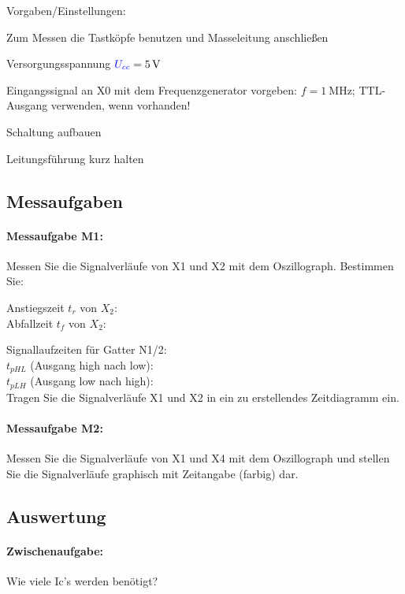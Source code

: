 \documentclass[11pt,a4paper,titlepage,parskip=half]{scrreprt}
\begin{document}
      Vorgaben/Einstellungen:
      \begin{itemize*}
        \item Zum Messen die Tastköpfe benutzen und Masseleitung anschließen
        \item Versorgungsspannung $\textcolor{blue}{U_{cc}} = \SI{5}{\volt}$
        \item Eingangssignal an X0 mit dem Frequenzgenerator vorgeben: $f = \SI{1}{\mega\Hz}$; TTL-Ausgang verwenden, wenn vorhanden!
        \item Schaltung aufbauen
        \item Leitungsführung kurz halten
      \end{itemize*}

      \subsection{Messaufgaben}
        \paragraph{Messaufgabe M1:} Messen Sie die Signalverläufe von X1 und X2 mit dem Oszillograph. Bestimmen Sie:

          Anstiegszeit $t_r$ von $X_2$: \\
          Abfallzeit $t_f$ von $X_2$: 

          Signallaufzeiten für Gatter N1/2:\\
          $t_{pHL}$ (Ausgang high nach low): \\
          $t_{pLH}$ (Ausgang low nach high): \\

          Tragen Sie die Signalverläufe X1 und X2 in ein zu erstellendes Zeitdiagramm ein.


        \paragraph{Messaufgabe M2:} Messen Sie die Signalverläufe von X1 und X4 mit dem Oszillograph und stellen Sie die
          Signalverläufe graphisch mit Zeitangabe (farbig) dar.

      \subsection{Auswertung}
        \paragraph{Zwischenaufgabe:} Wie viele Ic's werden benötigt?
                
\end{document}

